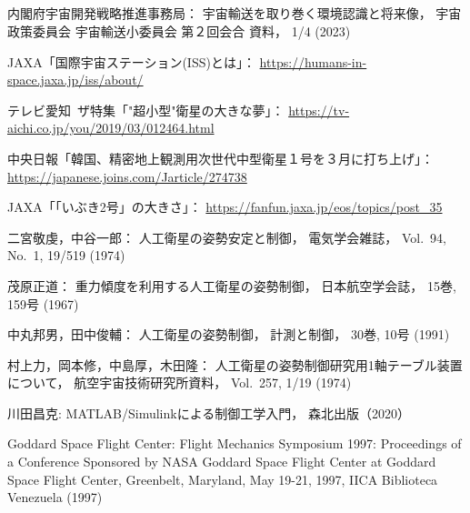 \begin{center}
\section*{}                      %
\vspace*{-2zh}
\end{center}

\begin{thebibliography}{99}
	内閣府宇宙開発戦略推進事務局：
	宇宙輸送を取り巻く環境認識と将来像，
	宇宙政策委員会 宇宙輸送小委員会 第２回会合 資料，
	1/4 (2023)

	JAXA「国際宇宙ステーション(ISS)とは」：
	\url{https://humans-in-space.jaxa.jp/iss/about/}

	テレビ愛知~ザ特集「"超小型"衛星の大きな夢」：
	\url{https://tv-aichi.co.jp/you/2019/03/012464.html}

	中央日報「韓国、精密地上観測用次世代中型衛星１号を３月に打ち上げ」：
	\url{https://japanese.joins.com/Jarticle/274738}
	
	JAXA「「いぶき2号」の大きさ」：
	\url{https://fanfun.jaxa.jp/eos/topics/post_35}

	二宮敬虔，中谷一郎：
	人工衛星の姿勢安定と制御，
	電気学会雑誌，
	Vol.~94, No.~1, 19/519 (1974)

	茂原正道：
	重力傾度を利用する人工衛星の姿勢制御，
	日本航空学会誌，
	15巻, 159号 (1967)

	中丸邦男，田中俊輔：
	人工衛星の姿勢制御，
	計測と制御，
	30巻, 10号 (1991)

	村上力，岡本修，中島厚，木田隆：
	人工衛星の姿勢制御研究用1軸テーブル装置について，
	航空宇宙技術研究所資料，
	Vol.~257, 1/19 (1974)

	川田昌克:
	MATLAB/Simulinkによる制御工学入門，
	森北出版（2020）

	Goddard Space Flight Center:
	Flight Mechanics Symposium 1997: Proceedings of a Conference Sponsored by NASA Goddard
	 Space Flight Center at Goddard Space Flight Center, Greenbelt, Maryland, May 19-21, 1997,
	 IICA Biblioteca Venezuela (1997)


\end{thebibliography}
